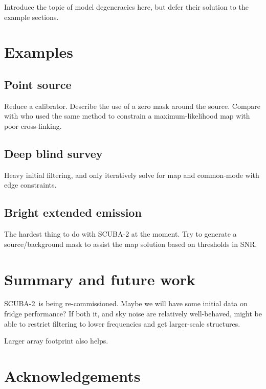 \documentclass[useAMS,usenatbib,usegraphicx,nofootinbib]{mn2e}
\newcommand{\snr}{SNR}
\newcommand{\scuba}{SCUBA-2}
\begin{document}
Introduce the topic of model degeneracies here, but defer their
solution to the example sections.


\section{Examples}
\label{sec:data}

\subsection{Point source}
Reduce a calibrator. Describe the use of a zero mask around the
source. Compare with \citet{wiebe2009} who used the same method to
constrain a maximum-likelihood map with poor cross-linking.

\subsection{Deep blind survey}
Heavy initial filtering, and only iteratively solve for map and
common-mode with edge constraints.


\subsection{Bright extended emission}
The hardest thing to do with SCUBA-2 at the moment. Try to generate a
source/background mask to assist the map solution based on thresholds
in \snr.

\section{Summary and future work}
\label{sec:summary}

\scuba\ is being re-commissioned. Maybe we will have some initial data
on fridge performance? If both it, and sky noise are relatively
well-behaved, might be able to restrict filtering to lower frequencies
and get larger-scale structures.

Larger array footprint also helps.


\section{Acknowledgements}
\end{document}

